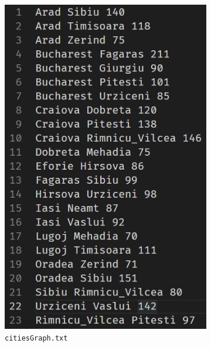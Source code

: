 \documentclass[a4paper, 11pt]{article}
\begin{document}
\begin{figure}[h]
\begin{subfigure}[b]{0.3\textwidth}
    \includegraphics[width=\textwidth,height=\textheight,keepaspectratio]{citiesGraph.png}
    \caption{\lstinline|citiesGraph.txt| }
  \end{subfigure}
  \hfill
  \begin{subfigure}[b]{0.3\textwidth}
    \centering

\end{subfigure}
\end{figure}
\end{document}

